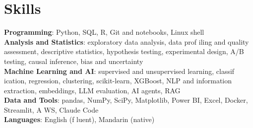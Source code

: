 \documentclass[letterpaper,11pt]{article}
\begin{document}
\section{\textbf{Skills}}
 \begin{itemize}[leftmargin=0.15in, label={}]
    \small{\item{
     \textbf{Programming}{: Python, SQL, R, Git and notebooks, Linux shell} \\
     \textbf{Analysis and Statistics}{: exploratory data analysis, data prof\kern0pt iling and quality assessment, descriptive statistics, hypothesis testing, experimental design, A/B testing, causal inference, bias and uncertainty} \\
     \textbf{Machine Learning and AI}{: supervised and unsupervised learning, classif\kern0pt ication, regression, clustering, scikit-learn, XGBoost, NLP and information extraction, embeddings, LLM evaluation, AI agents, RAG} \\
     \textbf{Data and Tools}{: pandas, NumPy, SciPy, Matplotlib, Power BI, Excel, Docker, Streamlit, A\kern0pt WS, Claude Code} \\
     \textbf{Languages}{: English (f\kern0pt luent), Mandarin (native)}}}

 \end{itemize}
\end{document}
